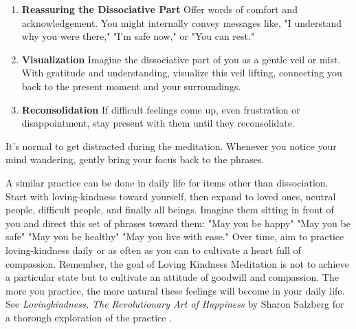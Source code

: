 \documentclass[12pt,letterpaper]{article}
\begin{document}
\begin{enumerate}
    \item \textbf{Reassuring the Dissociative Part} Offer words of comfort and acknowledgement. You might internally convey messages like, "I understand why you were there," "I'm safe now," or "You can rest."
    \item \textbf{Visualization} Imagine the dissociative part of you as a gentle veil or mist. With gratitude and understanding, visualize this veil lifting, connecting you back to the present moment and your surroundings.
    \item \textbf{Reconsolidation} If difficult feelings come up, even frustration or disappointment, stay present with them until they reconsolidate.
\end{enumerate}

It's normal to get distracted during the meditation. Whenever you notice your mind wandering, gently bring your focus back to the phrases.

A similar practice can be done in daily life for items other than dissociation. Start with loving-kindness toward yourself, then expand to loved ones, neutral people, difficult people, and finally all beings. Imagine them sitting in front of you and direct this set of phrases toward them: "May you be happy" "May you be safe" "May you be healthy" "May you live with ease." Over time, aim to practice loving-kindness daily or as often as you can to cultivate a heart full of compassion. Remember, the goal of Loving Kindness Meditation is not to achieve a particular state but to cultivate an attitude of goodwill and compassion. The more you practice, the more natural these feelings will become in your daily life. See \textit{Lovingkindness, The Revolutionary Art of Happiness} by Sharon Salzberg for a thorough exploration of the practice \cite{salzbergLovingKindness}. 
\end{document}
